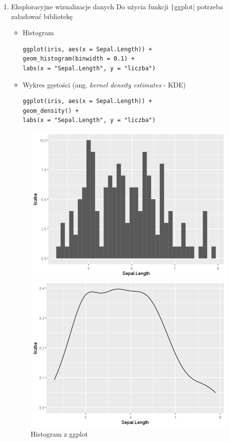 \documentclass[11pt]{article}
\begin{document}
\begin{enumerate}
        \clearpage
        \item Eksploracyjne wizualizacje danych
        Do użycia funkcji \texttt|ggplot| potrzeba załadować bibliotekę
        \begin{itemize}
        	\item Histogram
        	\begin{verbatim}
ggplot(iris, aes(x = Sepal.Length)) + 
geom_histogram(binwidth = 0.1) + 
labs(x = "Sepal.Length", y = "liczba")
        	\end{verbatim}
        	\item Wykres gęstości (ang. \textit{kernel density estimates} - KDE)
        	\begin{verbatim}
ggplot(iris, aes(x = Sepal.Length)) + 
geom_density() + 
labs(x = "Sepal.Length", y = "liczba")
        	\end{verbatim}
        \end{itemize}
        \begin{figure}[H]
        	\begin{minipage}{.5\textwidth}
        		\centering
        		\includegraphics[width=\textwidth]{imgs/ggplot_hist}
        		\caption{Histogram z ggplot}
        	\end{minipage}
        	\begin{minipage}{.5\textwidth}
        		\centering
        		\includegraphics[width=\textwidth]{imgs/ggplot_dense}

\end{minipage}
\end{figure}
\end{enumerate}
\end{document}
